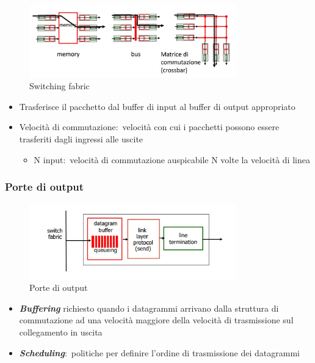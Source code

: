 \begin{figure}[H]
    \centering
    \includegraphics[width=0.8\textwidth]{immagini/Switching.jpg}
    \caption*{Switching fabric}
\end{figure}
\begin{itemize}
    \item Trasferisce il pacchetto dal buffer di input al buffer di output appropriato
    \item Velocità di commutazione:\ velocità con cui i pacchetti possono essere trasferiti dagli ingressi alle uscite
          \begin{itemize}
              \item N input:\ velocità di commutazione auspicabile N volte la velocità di linea
          \end{itemize}
\end{itemize}

\subsubsection{Porte di output}

\begin{figure}[H]
    \centering
    \includegraphics[width=0.8\textwidth]{immagini/PorteOutput.jpg}
    \caption*{Porte di output}
\end{figure}
\begin{itemize}
    \item \textbf{\emph{Buffering}} richiesto quando i datagrammi arrivano dalla struttura di commutazione ad una velocità maggiore della velocità di trasmissione sul collegamento in uscita
    \item \textbf{\emph{Scheduling}}:\ politiche per definire l’ordine di trasmissione dei datagrammi
\end{itemize}

